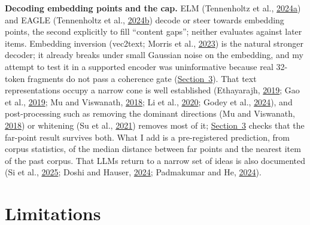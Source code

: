 \documentclass[
  10pt,
]{article}
\begin{document}
\textbf{Decoding embedding points and
the cap.} ELM (Tennenholtz et al.,
\hyperlink{ref-Tennenholtz2024a}{2024a})
and EAGLE (Tennenholtz et al.,
\hyperlink{ref-Tennenholtz2024b}{2024b})
decode or steer towards embedding
points, the second explicitly to fill
``content gaps''; neither evaluates
against later items. Embedding inversion
(vec2text; Morris et al.,
\hyperlink{ref-Morris2023}{2023}) is the
natural stronger decoder; it already
breaks under small Gaussian noise on the
embedding, and my attempt to test it in
a supported encoder was uninformative
because real 32-token fragments do not
pass a coherence gate
(\hyperref[sec:3]{Section~3}). That text
representations occupy a narrow cone is
well established (Ethayarajh,
\hyperlink{ref-Ethayarajh2019}{2019};
Gao et al.,
\hyperlink{ref-Gao2019}{2019}; Mu and
Viswanath, \hyperlink{ref-Mu2018}{2018};
Li et al., \hyperlink{ref-Li2020}{2020};
Godey et al.,
\hyperlink{ref-Godey2024}{2024}), and
post-processing such as removing the
dominant directions (Mu and Viswanath,
\hyperlink{ref-Mu2018}{2018}) or
whitening (Su et al.,
\hyperlink{ref-Su2021}{2021}) removes
most of it; \hyperref[sec:3]{Section~3}
checks that the far-point result
survives both. What I add is a
pre-registered prediction, from corpus
statistics, of the median distance
between far points and the nearest item
of the past corpus. That LLMs return to
a narrow set of ideas is also documented
(Si et al.,
\hyperlink{ref-Si2025}{2025}; Doshi and
Hauser, \hyperlink{ref-Doshi2024}{2024};
Padmakumar and He,
\hyperlink{ref-Padmakumar2024}{2024}).

\section{Limitations}\label{sec:8}
\end{document}
